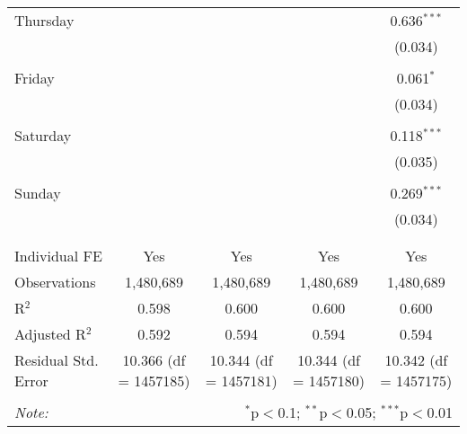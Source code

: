 \documentclass[
]{article}
\begin{document}
\begin{table}[!htbp]
{\begin{tabular}{@{\extracolsep{5pt}}lcccc}
 Thursday &  &  &  & 0.636$^{***}$ \\ 
  &  &  &  & (0.034) \\ 
  & & & & \\ 
 Friday &  &  &  & 0.061$^{*}$ \\ 
  &  &  &  & (0.034) \\ 
  & & & & \\ 
 Saturday &  &  &  & 0.118$^{***}$ \\ 
  &  &  &  & (0.035) \\ 
  & & & & \\ 
 Sunday &  &  &  & 0.269$^{***}$ \\ 
  &  &  &  & (0.034) \\ 
  & & & & \\ 
\hline \\[-1.8ex] 
Individual FE & Yes & Yes & Yes & Yes \\ 
Observations & 1,480,689 & 1,480,689 & 1,480,689 & 1,480,689 \\ 
R$^{2}$ & 0.598 & 0.600 & 0.600 & 0.600 \\ 
Adjusted R$^{2}$ & 0.592 & 0.594 & 0.594 & 0.594 \\ 
Residual Std. Error & 10.366 (df = 1457185) & 10.344 (df = 1457181) & 10.344 (df = 1457180) & 10.342 (df = 1457175) \\ 
\hline 
\hline \\[-1.8ex] 
\textit{Note:}  & \multicolumn{4}{r}{$^{*}$p$<$0.1; $^{**}$p$<$0.05; $^{***}$p$<$0.01} \\ 
\end{tabular}
} 
\end{table} 
\newpage
\end{document}
